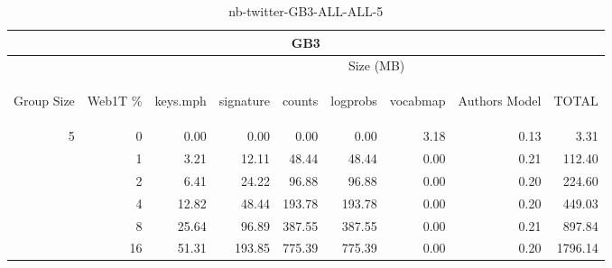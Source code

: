 \begin{center}
\begin{table}[htbp]
\begin{tabular}{ | r | r | r | r | r | r | r | r | r |}
\hline
\multicolumn{9}{|c|}{GB3}\\
\hline
 & & \multicolumn{7}{|c|}{Size (MB)}\\ \cline{3-9}
\begin{sideways}Group Size\end{sideways} & \begin{sideways}Web1T \% \end{sideways} & \begin{sideways}keys.mph\end{sideways} & \begin{sideways}signature\end{sideways} & \begin{sideways}counts\end{sideways} & \begin{sideways}logprobs\end{sideways} & \begin{sideways}vocabmap\end{sideways} & \begin{sideways}Authors Model \end{sideways} & \begin{sideways}TOTAL\end{sideways}\\
\hline
\multirow{5}{*}{5}
 & 0 & 0.00 & 0.00 & 0.00 & 0.00 & 3.18 & 0.13 & 3.31\\ \cline{2-9}
 & 1 & 3.21 & 12.11 & 48.44 & 48.44 & 0.00 & 0.21 & 112.40\\ \cline{2-9}
 & 2 & 6.41 & 24.22 & 96.88 & 96.88 & 0.00 & 0.20 & 224.60\\ \cline{2-9}
 & 4 & 12.82 & 48.44 & 193.78 & 193.78 & 0.00 & 0.20 & 449.03\\ \cline{2-9}
 & 8 & 25.64 & 96.89 & 387.55 & 387.55 & 0.00 & 0.21 & 897.84\\ \cline{2-9}
 & 16 & 51.31 & 193.85 & 775.39 & 775.39 & 0.00 & 0.20 & 1796.14\\ \cline{2-9}
\hline
\end{tabular}
\caption{nb-twitter-GB3-ALL-ALL-5}
\label{table:nb-twitter-GB3-ALL-ALL-5}
\end{table}
\end{center}

